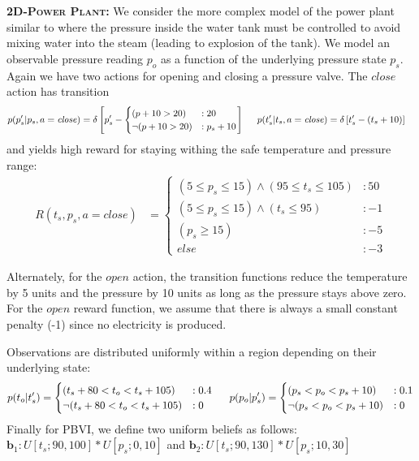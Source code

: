 \documentclass{article} %
\renewcommand{\vec}[1]{\mathbf{#1}} %
\newcommand{\open}{\mathit{open}}
\newcommand{\close}{\mathit{close}}
\begin{document}
{\bf \textsc{\bf 2D-Power Plant}:} We consider the more complex model
of the power plant similar to \cite{steam2} where the pressure inside
the water tank must be controlled to avoid mixing water into the steam
(leading to explosion of the tank).  We model an observable pressure
reading $p_o$ as a function of the underlying pressure state $p_s$.
Again we have two actions for opening and closing a pressure valve.
The $\close$ action has transition 
{\footnotesize
\begin{align}
p(p_s'|p_s,a=\close)&= \delta\left[ p_s' - 
\begin{cases}
 (p+10> 20) &: 20 \\ 
\neg (p+10> 20) &: p_s + 10 \\
\end{cases}
\right]\nonumber
\hspace{5mm} 
p(t_s'|t_s,a=\close)= \delta\left[ t_s' - (t_s +10) \right]\nonumber
\end{align}
}
and yields high reward for staying withing the safe temperature and pressure range:
{\footnotesize
\vspace{-1mm}
\begin{align}
R(t_s,p_s,a=\close) &= 
\begin{cases}
(5 \leq p_s \leq 15)\wedge (95 \leq t_s \leq 105)&:50\\
(5 \leq p_s \leq 15)\wedge (t_s \leq 95)&: -1\\
(p_s \geq 15) &: -5\\ 
else &: -3
\end{cases}\nonumber
\end{align}
\vspace{-4mm}
}

Alternately, for the $\open$ action, the transition functions reduce
the temperature by 5 units and the pressure by 10 units as long as the
pressure stays above zero. For the $\open$ reward function, we assume
that there is always a small constant penalty (-1) since no electricity
is produced.

Observations are distributed uniformly within a region depending on
their underlying state:
{\footnotesize
\begin{align}
p(t_o|t_s') = 
\begin{cases}
(t_s + 80<t_o<t_s+ 105) &: 0.4 \\
 \neg (t_s + 80<t_o<t_s+ 105) &: 0 \\
\end{cases}\nonumber
\hspace{5mm} 
p(p_o|p_s') = 
\begin{cases}
(p_s<p_o<p_s+10) &: 0.1 \\
 \neg(p_s<p_o<p_s+10) &: 0 \\
\end{cases}\nonumber
\end{align}
}
Finally for PBVI, we define two uniform beliefs as follows: 
$\vec{b}_1: U[t_s;90,100]*U[p_s;0,10]$ and $\vec{b}_2: U[t_s;90,130]*U[p_s;10,30]$
\end{document}
